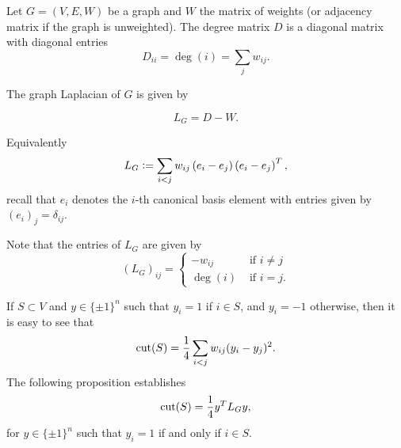 \begin{definition}
\label{def:graphLaplacian} 
Let $G=(V,E,W)$ be a graph and $W$ the matrix of weights (or adjacency matrix if the graph is unweighted). The degree matrix $D$ is a diagonal matrix with diagonal entries
\begin{equation}
    \label{degreematrix}
D_{ii} = \deg(i) = \sum_{j} w_{ij}.
\end{equation}

The graph Laplacian of $G$ is given by

\begin{equation}
\label{graphlalpacian}
L_G = D - W.
\end{equation}

Equivalently
\[
 L_G \mathrel{\mathop:}=  \sum_{i<j}w_{ij} \left( e_i - e_j \right)\left( e_i - e_j \right)^T,
\]
recall that $e_i$ denotes the $i$-th canonical basis element with entries given by $(e_i)_j=\delta_{ij}$.
\end{definition}
Note that the entries of $L_G$ are given by
\[
 \left(L_G\right)_{ij} = \left\{   \begin{array}{ll}  -w_{ij} & \text{ if  } i\neq j \\ \deg(i) & \text{ if  } i=j.      \end{array} \right.
\]


If $S\subset V$ and $y\in\{\pm 1\}^n$ such that $y_i=1$ if $i\in S$, and $y_i=-1$ otherwise, then it is easy to see that
\[
\operatorname{cut}(S)  =  \frac14 \sum_{i<j}w_{ij}(y_i-y_j)^2.
\]
The following proposition establishes
\begin{equation}\label{eq:cut_Laplacian}
\operatorname{cut}(S) = \frac14 y^TL_Gy,
\end{equation}
for $y\in\{\pm 1\}^n$ such that $y_i=1$ if and only if $i\in S$. %


